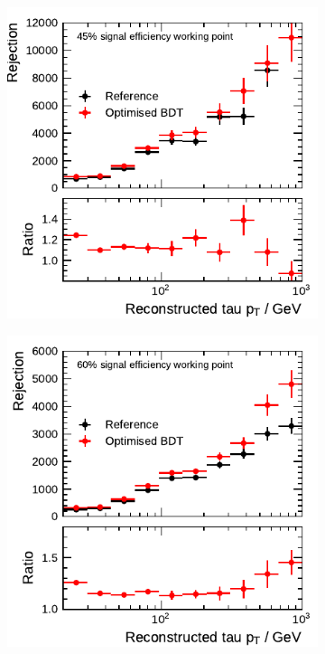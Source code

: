 \begin{figure}[htb]
  \centering
  \begin{subfigure}{0.48\textwidth}
    \centering
    \includegraphics{./figures/bdt_perf/post_optimisation/3p_highpt/rejection_tight_ratio_highpt.pdf}
  \end{subfigure}\hfill
  \begin{subfigure}{0.48\textwidth}
    \centering
    \includegraphics{./figures/bdt_perf/post_optimisation/3p_highpt/rejection_medium_ratio_highpt.pdf}

\end{subfigure}
\end{figure}
